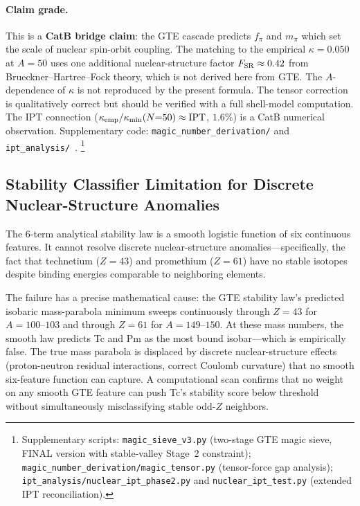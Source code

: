 \documentclass[9pt,twocolumn]{extarticle}
\begin{document}
\paragraph{Claim grade.} This is a \textbf{CatB bridge claim}: the GTE cascade predicts $f_\pi$ and $m_\pi$ which set the scale of nuclear spin-orbit coupling. The matching to the empirical $\kappa = 0.050$ at $A = 50$ uses one additional nuclear-structure factor $F_{\rm SR} \approx 0.42$ from Brueckner--Hartree--Fock theory, which is not derived here from GTE. The $A$-dependence of $\kappa$ is not reproduced by the present formula. The tensor correction is qualitatively correct but should be verified with a full shell-model computation. The IPT connection ($\kappa_{\rm emp}/\kappa_{\rm min}(N{=}50) \approx \mathrm{IPT}$, $1.6\%$) is a CatB numerical observation. Supplementary code: \texttt{magic\_number\_derivation/} and \texttt{ipt\_analysis/}~\cite{MagicNumberCode}.%
\footnote{Supplementary scripts:
\texttt{magic\_sieve\_v3.py} (two-stage GTE magic sieve, FINAL version with stable-valley Stage~2 constraint);
\texttt{magic\_number\_derivation/magic\_tensor.py} (tensor-force gap analysis);
\texttt{ipt\_analysis/nuclear\_ipt\_phase2.py} and \texttt{nuclear\_ipt\_test.py} (extended IPT reconciliation).}

\subsection{Stability Classifier Limitation for Discrete Nuclear-Structure Anomalies}
\label{sec:stability-limitation}

The 6-term analytical stability law is a smooth logistic function of six continuous features. It cannot resolve discrete nuclear-structure anomalies---specifically, the fact that technetium ($Z=43$) and promethium ($Z=61$) have no stable isotopes despite binding energies comparable to neighboring elements.

The failure has a precise mathematical cause: the GTE stability law's predicted isobaric mass-parabola minimum sweeps continuously through $Z=43$ for $A=100$--$103$ and through $Z=61$ for $A=149$--$150$. At these mass numbers, the smooth law predicts Tc and Pm as the most bound isobar---which is empirically false. The true mass parabola is displaced by discrete nuclear-structure effects (proton-neutron residual interactions, correct Coulomb curvature) that no smooth six-feature function can capture. A computational scan confirms that no weight on any smooth GTE feature can push Tc's stability score below threshold without simultaneously misclassifying stable odd-$Z$ neighbors.
\end{document}

